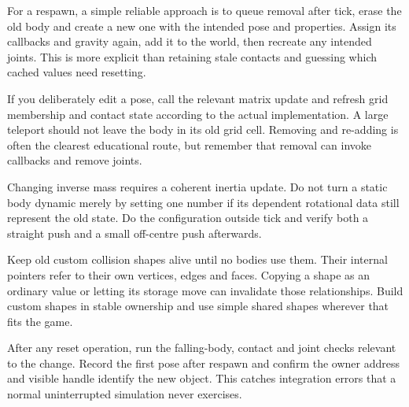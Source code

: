 \documentclass[11pt,a4paper]{article}
\begin{document}
For a respawn, a simple reliable approach is to queue removal after tick, erase the old body and create a new one with the intended pose and properties. Assign its callbacks and gravity again, add it to the world, then recreate any intended joints. This is more explicit than retaining stale contacts and guessing which cached values need resetting.

If you deliberately edit a pose, call the relevant matrix update and refresh grid membership and contact state according to the actual implementation. A large teleport should not leave the body in its old grid cell. Removing and re-adding is often the clearest educational route, but remember that removal can invoke callbacks and remove joints.

Changing inverse mass requires a coherent inertia update. Do not turn a static body dynamic merely by setting one number if its dependent rotational data still represent the old state. Do the configuration outside tick and verify both a straight push and a small off-centre push afterwards.

Keep old custom collision shapes alive until no bodies use them. Their internal pointers refer to their own vertices, edges and faces. Copying a shape as an ordinary value or letting its storage move can invalidate those relationships. Build custom shapes in stable ownership and use simple shared shapes wherever that fits the game.

After any reset operation, run the falling-body, contact and joint checks relevant to the change. Record the first pose after respawn and confirm the owner address and visible handle identify the new object. This catches integration errors that a normal uninterrupted simulation never exercises.
\end{document}
